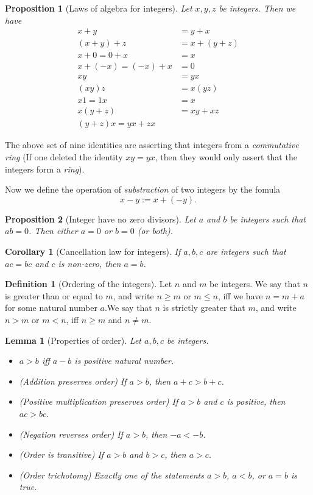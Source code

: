 \documentclass[
]{book}
\providecommand{\tightlist}{%
  \setlength{\itemsep}{0pt}\setlength{\parskip}{0pt}}
\newtheorem{lemma}{Lemma}[chapter]
\newtheorem{corollary}{Corollary}[chapter]
\newtheorem{proposition}{Proposition}[chapter]
\theoremstyle{definition}
\newtheorem{definition}{Definition}[chapter]
\theoremstyle{definition}
\theoremstyle{definition}
\theoremstyle{definition}
\theoremstyle{remark}
\begin{document}
\begin{proposition}[Laws of algebra for integers]
Let \(x,y,z\) be integers. Then we have
\[
\begin{aligned}
  x+y&=y+x\\
  (x+y)+z&=x+(y+z)\\
  x+0=0+x&=x\\
  x+(-x) = (-x)+x&=0\\
  xy&=yx\\
  (xy)z&=x(yz)\\
  x1=1x&=x\\
  x(y+z)&=xy+xz\\
  (y+z)x=yx+zx
\end{aligned}
\]
\end{proposition}

The above set of nine identities are asserting that integers from a \emph{commutative ring} (If one deleted the identity \(xy=yx\), then they would only assert that the integers form a \emph{ring}).

Now we define the operation of \emph{substraction} of two integers by the fomula
\[
x-y:=x+(-y).
\]

\begin{proposition}[Integer have no zero divisors]
Let \(a\) and \(b\) be integers such that \(ab=0\). Then either \(a=0\) or \(b=0\) (or both).
\end{proposition}

\begin{corollary}[Cancellation law for integers]
If \(a,b,c\) are integers such that \(ac=bc\) and \(c\) is non-zero, then \(a=b\).
\end{corollary}

\begin{definition}[Ordering of the integers]
Let \(n\) and \(m\) be integers. We say that \(n\) is greater than or equal to \(m\), and write \(n\geq m\) or \(m\leq n\), iff we have \(n=m+a\) for some natural number \(a\).We say that \(n\) is strictly greater that \(m\), and write \(n>m\) or \(m<n\), iff \(n\geq m\) and \(n \ne m\).
\end{definition}

\begin{lemma}[Properties of order]

Let \(a,b,c\) be integers.

\begin{itemize}
\tightlist
\item
  \(a>b\) iff \(a-b\) is positive natural number.
\item
  (Addition preserves order) If \(a>b\), then \(a+c>b+c\).
\item
  (Positive multiplication preserves order) If \(a>b\) and \(c\) is positive, then \(ac>bc\).
\item
  (Negation reverses order) If \(a>b\), then \(-a<-b\).
\item
  (Order is transitive) If \(a>b\) and \(b>c\), then \(a>c\).
\item
  (Order trichotomy) Exactly one of the statements \(a>b\), \(a<b\), or \(a=b\) is true.
\end{itemize}

\end{lemma}
\end{document}

